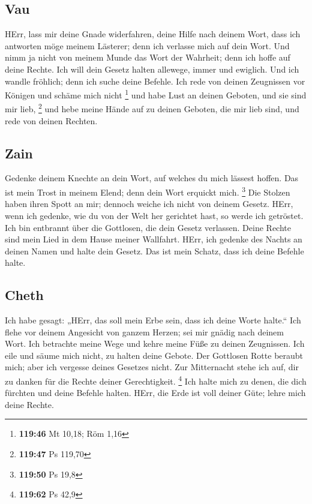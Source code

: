 \hypertarget{vau}{%
\subsection{Vau}\label{vau}}

 HErr, lass mir deine Gnade widerfahren, deine Hilfe nach
deinem Wort,  dass ich antworten möge meinem Lästerer;
denn ich verlasse mich auf dein Wort.  Und nimm ja nicht
von meinem Munde das Wort der Wahrheit; denn ich hoffe auf deine Rechte.
 Ich will dein Gesetz halten allewege, immer und
ewiglich.  Und ich wandle fröhlich; denn ich suche deine
Befehle.  Ich rede von deinen Zeugnissen vor Königen und
schäme mich nicht \footnote{\textbf{119:46} Mt 10,18; Röm 1,16}
 und habe Lust an deinen Geboten, und sie sind mir lieb,
\footnote{\textbf{119:47} Ps 119,70}  und hebe meine
Hände auf zu deinen Geboten, die mir lieb sind, und rede von deinen
Rechten.

\hypertarget{zain}{%
\subsection{Zain}\label{zain}}

 Gedenke deinem Knechte an dein Wort, auf welches du mich
lässest hoffen.  Das ist mein Trost in meinem Elend; denn
dein Wort erquickt mich. \footnote{\textbf{119:50} Ps 19,8}
 Die Stolzen haben ihren Spott an mir; dennoch weiche ich
nicht von deinem Gesetz.  HErr, wenn ich gedenke, wie du
von der Welt her gerichtet hast, so werde ich getröstet. 
Ich bin entbrannt über die Gottlosen, die dein Gesetz verlassen.
 Deine Rechte sind mein Lied in dem Hause meiner
Wallfahrt.  HErr, ich gedenke des Nachts an deinen Namen
und halte dein Gesetz.  Das ist mein Schatz, dass ich
deine Befehle halte.

\hypertarget{cheth}{%
\subsection{Cheth}\label{cheth}}

 Ich habe gesagt: „HErr, das soll mein Erbe sein, dass
ich deine Worte halte.``  Ich flehe vor deinem Angesicht
von ganzem Herzen; sei mir gnädig nach deinem Wort.  Ich
betrachte meine Wege und kehre meine Füße zu deinen Zeugnissen.
 Ich eile und säume mich nicht, zu halten deine Gebote.
 Der Gottlosen Rotte beraubt mich; aber ich vergesse
deines Gesetzes nicht.  Zur Mitternacht stehe ich auf,
dir zu danken für die Rechte deiner Gerechtigkeit. \footnote{\textbf{119:62}
  Ps 42,9}  Ich halte mich zu denen, die dich fürchten
und deine Befehle halten.  HErr, die Erde ist voll deiner
Güte; lehre mich deine Rechte.

